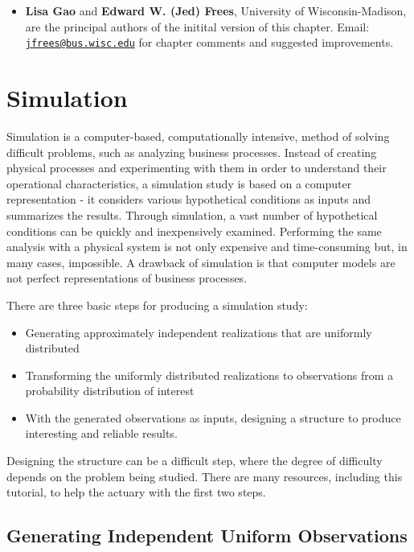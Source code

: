 \documentclass[]{book}
\providecommand{\tightlist}{%
  \setlength{\itemsep}{0pt}\setlength{\parskip}{0pt}}
\theoremstyle{definition}
\theoremstyle{definition}
\theoremstyle{definition}
\theoremstyle{remark}
\begin{document}
\begin{itemize}
\tightlist
\item
  \textbf{Lisa Gao} and \textbf{Edward W. (Jed) Frees}, University of
  Wisconsin-Madison, are the principal authors of the initital version
  of this chapter. Email:
  \href{mailto:jfrees@bus.wisc.edu}{\nolinkurl{jfrees@bus.wisc.edu}} for
  chapter comments and suggested improvements.
\end{itemize}

\chapter{Simulation}\label{simulation}

Simulation is a computer-based, computationally intensive, method of
solving difficult problems, such as analyzing business processes.
Instead of creating physical processes and experimenting with them in
order to understand their operational characteristics, a simulation
study is based on a computer representation - it considers various
hypothetical conditions as inputs and summarizes the results. Through
simulation, a vast number of hypothetical conditions can be quickly and
inexpensively examined. Performing the same analysis with a physical
system is not only expensive and time-consuming but, in many cases,
impossible. A drawback of simulation is that computer models are not
perfect representations of business processes.

There are three basic steps for producing a simulation study:

\begin{itemize}
\item
  Generating approximately independent realizations that are uniformly
  distributed
\item
  Transforming the uniformly distributed realizations to observations
  from a probability distribution of interest
\item
  With the generated observations as inputs, designing a structure to
  produce interesting and reliable results.
\end{itemize}

Designing the structure can be a difficult step, where the degree of
difficulty depends on the problem being studied. There are many
resources, including this tutorial, to help the actuary with the first
two steps.

\section{Generating Independent Uniform
Observations}\label{generating-independent-uniform-observations}
\end{document}
